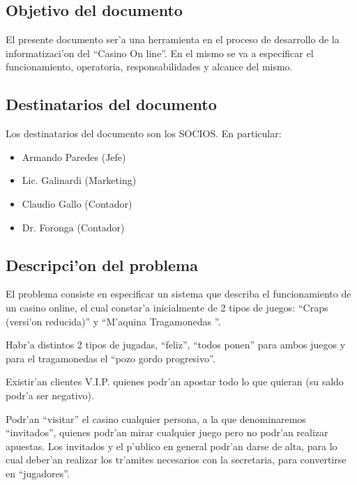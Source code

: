 \subsection{ Objetivo del documento }

El presente documento ser'a una herramienta en el proceso 
de desarrollo de la informatizaci'on del ``Casino On line''. En el mismo 
se va a especificar el funcionamiento, operatoria, responsabilidades y alcance
del mismo.



\subsection{ Destinatarios del documento	}
Los destinatarios del documento son los SOCIOS. En particular:

\begin{itemize}
    \item Armando Paredes (Jefe)
    \item Lic. Galinardi (Marketing)
    \item Claudio Gallo (Contador)
    \item Dr. Foronga (Contador)
\end{itemize}


\subsection{ Descripci'on del problema }
El problema consiste en especificar un sistema que describa el funcionamiento
de un casino online, el cual constar'a inicialmente de 2 tipos de juegos: ``Craps (versi'on reducida)'' y ``M'aquina Tragamonedas ''.

Habr'a distintos 2 tipos de jugadas, ``feliz'', ``todos ponen'' para ambos juegos y para el tragamonedas el ``pozo gordo progresivo''. 

Existir'an clientes V.I.P. quienes podr'an apostar todo lo que quieran (su saldo podr'a ser negativo).

Podr'an ``visitar'' el casino cualquier persona, a la que denominaremos ``invitados'', quienes podr'an mirar cualquier juego pero no podr'an realizar apuestas. Los invitados y el p'ublico en general podr'an darse de alta, para lo cual deber'an realizar los tr'amites necesarios con la secretaria, para convertirse en ``jugadores''.

